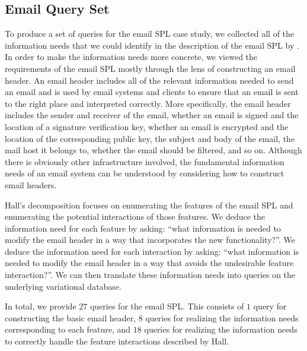 \subsection{Email Query Set}
\label{sec:enron-qs}


To produce a set of queries for the email SPL case study, we collected all of
the information needs that we could identify in the description of the email
SPL by \citet{Hall05}. In order to make the information needs more concrete, we
viewed the requirements of the email SPL mostly through the lens of
constructing an email header.
%
An email header includes all of the relevant information needed to send an
email and is used by email systems and clients to ensure that an email is sent to
the right place and interpreted correctly. 
More specifically, the email header
includes the sender and receiver of the email, whether an email is signed and
the location of a signature verification key, whether an email is encrypted and
the location of the corresponding public key, the subject and body of the
email, the mail host it belongs to, whether the email should be filtered,
and so on.
%
Although there is obviously other infrastructure involved, the fundamental
information needs of an email system can be understood by considering how to
construct email headers.


Hall's decomposition focuses on enumerating the features of the email SPL and
enumerating the potential interactions of those features.
%
We deduce the information need for each feature by asking: ``what information
is needed to modify the email header in a way that incorporates the new
functionality?''. We deduce the information need for each interaction by
asking: ``what information is needed to modify the email header in a way that
avoids the undesirable feature interaction?''.
%
We can then translate these information needs into queries on the underlying
variational database.


In total, we provide $27$ queries for the email SPL.
%
%
This consists of $1$ query for constructing the basic email header, $8$ queries
for realizing the information needs corresponding to each feature, and $18$
queries for realizing the information needs to correctly handle the feature
interactions described by Hall.


